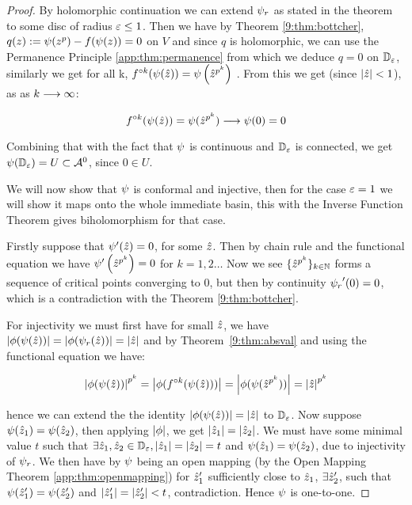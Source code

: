 \documentclass[../main.tex]{subfiles}
\begin{document}
\begin{proof}
 By holomorphic continuation we can extend $\psi_r$ as stated in the theorem to some disc of radius $\varepsilon\leq1$. Then we have by Theorem \ref{9:thm:bottcher}, $q(z) := \psi(z^p)-f(\psi(z)) = 0$ on $V$ and since $q$ is holomorphic, we can use the Permanence Principle \ref{app:thm:permanence} from which we deduce $q=0$ on $\mathbb{D}_{\varepsilon}$, similarly we get for all k, $f^{\circ k}(\psi(\hat{z})) = \psi\left(\hat{z}^{p^{k}}\right)$ . From this we get (since $\left|\hat{z}\right|<1$), as as $k\longrightarrow \infty$:

$$f^{\circ k}(\psi(\hat{z})) = \psi(\hat{z}^{p^{k}}) \longrightarrow \psi(0) = 0$$

Combining that with the fact that $\psi$ is continuous and $\mathbb{D}_{\varepsilon}$ is connected, we get $\psi(\mathbb{D}_{\varepsilon}) = U \subset \mathcal{A}^0$, since $0 \in U$.

We will now show that  $\psi$ is conformal and injective, then for the case $\varepsilon=1$ we will show it maps onto the whole immediate basin, this with the Inverse Function Theorem gives biholomorphism for that case. 

Firstly suppose that ${\psi}'(\hat{z}) = 0$, for some $\hat{z}$. Then by chain rule and the functional equation we have ${\psi}'\left(\hat{z}^{p^k}\right) = 0$ for $k = 1, 2\dots$ Now we see $\{\hat{z}^{p^k}\}_{k\in\mathbb{N}}$ forms a sequence of critical points converging to 0, but then by continuity ${\psi_{r}}'(0) = 0$, which is a contradiction with the Theorem
\ref{9:thm:bottcher}. 

For injectivity we must first have for small $\hat{z}$, we have $\left|\phi(\psi(\hat{z}))\right| = \left|\phi(\psi_r(\hat{z}))\right| = \left|\hat{z}\right|$ and by Theorem~\ref{9:thm:absval} and using the functional equation we have: 

$$\left|\phi(\psi(\hat{z}))\right|^{p^{k}} = \left|\phi(f^{\circ k}(\psi(\hat{z})))\right|=\left|\phi(\psi(\hat{z}^{p^k}))\right| = \left|\hat{z}\right|^{p^{k}}$$

hence we can extend the the identity $\left|\phi(\psi(\hat{z}))\right| = \left|\hat{z}\right|$ to $\mathbb{D}_{\varepsilon}$. Now suppose $\psi(\hat{z}_1) = \psi(\hat{z}_2)$, then applying $\left|\phi\right|$, we get $\left|\hat{z}_1\right|=\left|\hat{z}_2\right|$. We must have some minimal value $t$ such that $\exists \hat{z}_1, \hat{z}_2 \in \mathbb{D}_{\varepsilon}, \left|\hat{z}_1\right|=\left|\hat{z}_2\right|=t$ and $\psi(\hat{z}_1)=\psi(\hat{z}_2)$, due to injectivity of $\psi_r$. We then have by $\psi$ being an open mapping (by the Open Mapping Theorem \ref{app:thm:openmapping}) for $\hat{z}_1'$ sufficiently close to $\hat{z}_1$, $\exists \hat{z}_2'$, such that $\psi(\hat{z}_1')=\psi(\hat{z}_2')$ and $\left|\hat{z}_1'\right|=\left|\hat{z}_2'\right|<t$, contradiction. Hence $\psi$ is one-to-one. 


\end{proof}
\end{document}
